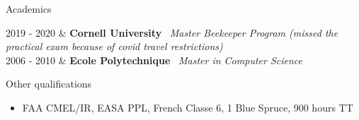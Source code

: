 \documentclass{cv}
\newcommand{\activite}[1]{\textbf{#1}\ }
\newcommand{\comment}[1]{\textsl{#1}\ }
\begin{document}
\begin{rubriquetableau}[4.0cm]{Academics}


  2019 - 2020
	& \activite{Cornell University}
	\comment{Master Beekeeper Program (missed the practical exam because of covid travel restrictions)} \\[1mm]

2006 - 2010
	& \activite{Ecole Polytechnique}
	\comment{Master in Computer Science}

 \end{rubriquetableau}

\begin{rubrique}{Other qualifications}
\begin{itemize}
\item FAA CMEL/IR, EASA PPL, French Classe 6, 1 Blue Spruce, 900 hours TT
\end{itemize}
\end{rubrique}
\end{document}
